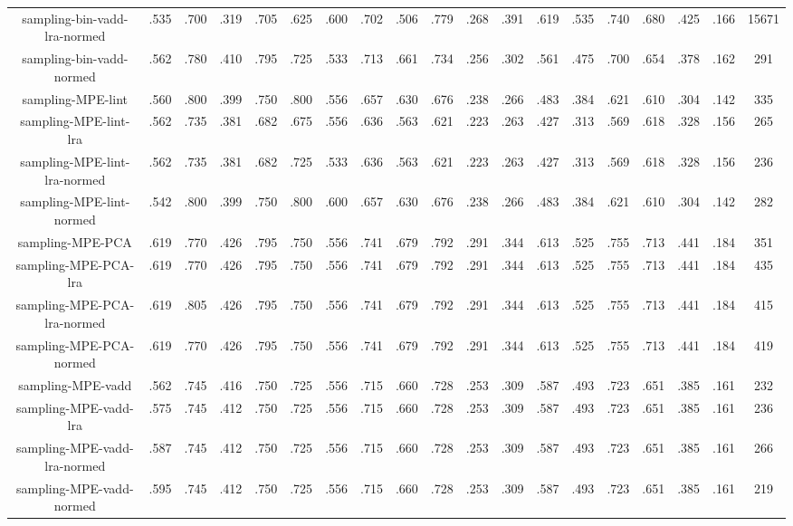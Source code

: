 {{\begin{tabular}{|c|c|c|c|c|c|c|c|c|c|c|c|c|c|c|c|c|c|c|}
    sampling-bin-vadd-lra-normed & .535 & .700 & .319 & .705 & .625 & .600 & .702 & .506 & .779 & .268 & .391 & .619 & .535 & .740 & .680 & .425 & .166 & 15671 \\
    sampling-bin-vadd-normed & .562 & .780 & .410 & .795 & .725 & .533 & .713 & .661 & .734 & .256 & .302 & .561 & .475 & .700 & .654 & .378 & .162 & 291 \\
    \hline
    sampling-MPE-lint & .560 & .800 & .399 & .750 & .800 & .556 & .657 & .630 & .676 & .238 & .266 & .483 & .384 & .621 & .610 & .304 & .142 & 335 \\
    sampling-MPE-lint-lra & .562 & .735 & .381 & .682 & .675 & .556 & .636 & .563 & .621 & .223 & .263 & .427 & .313 & .569 & .618 & .328 & .156 & 265 \\
    sampling-MPE-lint-lra-normed & .562 & .735 & .381 & .682 & .725 & .533 & .636 & .563 & .621 & .223 & .263 & .427 & .313 & .569 & .618 & .328 & .156 & 236 \\
    sampling-MPE-lint-normed & .542 & .800 & .399 & .750 & .800 & .600 & .657 & .630 & .676 & .238 & .266 & .483 & .384 & .621 & .610 & .304 & .142 & 282 \\
    \hline
    sampling-MPE-PCA & .619 & .770 & .426 & .795 & .750 & .556 & .741 & .679 & .792 & .291 & .344 & .613 & .525 & .755 & .713 & .441 & .184 & 351 \\
    sampling-MPE-PCA-lra & .619 & .770 & .426 & .795 & .750 & .556 & .741 & .679 & .792 & .291 & .344 & .613 & .525 & .755 & .713 & .441 & .184 & 435 \\
    sampling-MPE-PCA-lra-normed & .619 & .805 & .426 & .795 & .750 & .556 & .741 & .679 & .792 & .291 & .344 & .613 & .525 & .755 & .713 & .441 & .184 & 415 \\
    sampling-MPE-PCA-normed & .619 & .770 & .426 & .795 & .750 & .556 & .741 & .679 & .792 & .291 & .344 & .613 & .525 & .755 & .713 & .441 & .184 & 419 \\
    \hline
    sampling-MPE-vadd & .562 & .745 & .416 & .750 & .725 & .556 & .715 & .660 & .728 & .253 & .309 & .587 & .493 & .723 & .651 & .385 & .161 & 232 \\
    sampling-MPE-vadd-lra & .575 & .745 & .412 & .750 & .725 & .556 & .715 & .660 & .728 & .253 & .309 & .587 & .493 & .723 & .651 & .385 & .161 & 236 \\
    sampling-MPE-vadd-lra-normed & .587 & .745 & .412 & .750 & .725 & .556 & .715 & .660 & .728 & .253 & .309 & .587 & .493 & .723 & .651 & .385 & .161 & 266 \\
    sampling-MPE-vadd-normed & .595 & .745 & .412 & .750 & .725 & .556 & .715 & .660 & .728 & .253 & .309 & .587 & .493 & .723 & .651 & .385 & .161 & 219 \\

\end{tabular}}}
